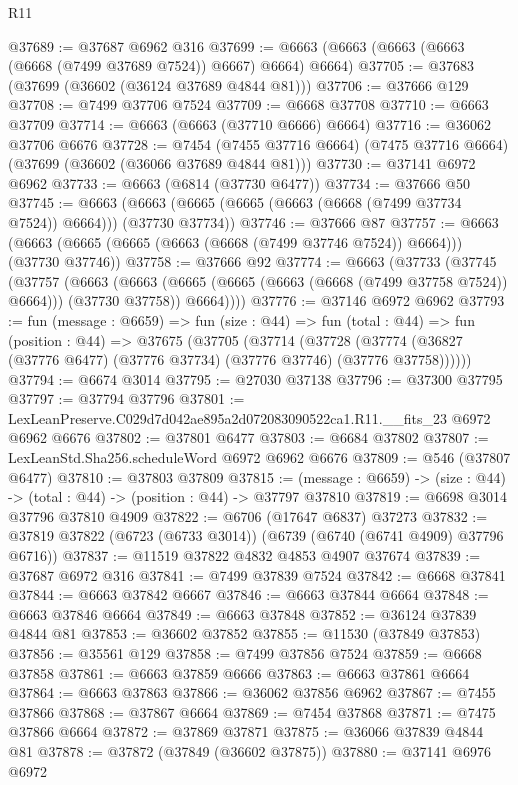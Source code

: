 \begin{lexlean}{R11}
\begin{coremodule}
@37689 := @37687 @6962 @316
@37699 := @6663 (@6663 (@6663 (@6663 (@6668 (@7499 @37689 @7524)) @6667) @6664) @6664)
@37705 := @37683 (@37699 (@36602 (@36124 @37689 @4844 @81)))
@37706 := @37666 @129
@37708 := @7499 @37706 @7524
@37709 := @6668 @37708
@37710 := @6663 @37709
@37714 := @6663 (@6663 (@37710 @6666) @6664)
@37716 := @36062 @37706 @6676
@37728 := @7454
    (@7455 @37716 @6664)
    (@7475 @37716 @6664)
    (@37699 (@36602 (@36066 @37689 @4844 @81)))
@37730 := @37141 @6972 @6962
@37733 := @6663 (@6814 (@37730 @6477))
@37734 := @37666 @50
@37745 := @6663 (@6663 (@6665 (@6665 (@6663 (@6668 (@7499 @37734 @7524)) @6664))) (@37730 @37734))
@37746 := @37666 @87
@37757 := @6663 (@6663 (@6665 (@6665 (@6663 (@6668 (@7499 @37746 @7524)) @6664))) (@37730 @37746))
@37758 := @37666 @92
@37774 := @6663
    (@37733
      (@37745
        (@37757
          (@6663
            (@6663 (@6665 (@6665 (@6663 (@6668 (@7499 @37758 @7524)) @6664))) (@37730 @37758))
            @6664))))
@37776 := @37146 @6972 @6962
@37793 := fun (message : @6659) =>
  fun (size : @44) =>
  fun (total : @44) =>
  fun (position : @44) =>
  @37675
    (@37705
      (@37714
        (@37728 (@37774 (@36827 (@37776 @6477) (@37776 @37734) (@37776 @37746) (@37776 @37758))))))
@37794 := @6674 @3014
@37795 := @27030 @37138
@37796 := @37300 @37795
@37797 := @37794 @37796
@37801 := LexLeanPreserve.C029d7d042ae895a2d072083090522ca1.R11.__fits_23 @6972 @6962 @6676
@37802 := @37801 @6477
@37803 := @6684 @37802
@37807 := LexLeanStd.Sha256.scheduleWord @6972 @6962 @6676
@37809 := @546 (@37807 @6477)
@37810 := @37803 @37809
@37815 := (message : @6659) -> (size : @44) -> (total : @44) -> (position : @44) -> @37797 @37810
@37819 := @6698 @3014 @37796 @37810 @4909
@37822 := @6706 (@17647 @6837) @37273
@37832 := @37819 @37822 (@6723 (@6733 @3014)) (@6739 (@6740 (@6741 @4909) @37796 @6716))
@37837 := @11519 @37822 @4832 @4853 @4907 @37674
@37839 := @37687 @6972 @316
@37841 := @7499 @37839 @7524
@37842 := @6668 @37841
@37844 := @6663 @37842 @6667
@37846 := @6663 @37844 @6664
@37848 := @6663 @37846 @6664
@37849 := @6663 @37848
@37852 := @36124 @37839 @4844 @81
@37853 := @36602 @37852
@37855 := @11530 (@37849 @37853)
@37856 := @35561 @129
@37858 := @7499 @37856 @7524
@37859 := @6668 @37858
@37861 := @6663 @37859 @6666
@37863 := @6663 @37861 @6664
@37864 := @6663 @37863
@37866 := @36062 @37856 @6962
@37867 := @7455 @37866
@37868 := @37867 @6664
@37869 := @7454 @37868
@37871 := @7475 @37866 @6664
@37872 := @37869 @37871
@37875 := @36066 @37839 @4844 @81
@37878 := @37872 (@37849 (@36602 @37875))
@37880 := @37141 @6976 @6972

\end{coremodule}
\end{lexlean}
